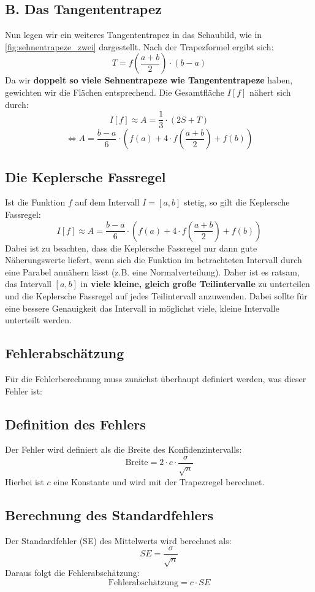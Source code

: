 \subsection*{B. Das Tangententrapez}

Nun legen wir ein weiteres Tangententrapez in das Schaubild, wie in \autoref{fig:sehnentrapeze_zwei} dargestellt. Nach der Trapezformel ergibt sich:
\[
T = f\left(\frac{a + b}{2}\right) \cdot (b - a)
\]
Da wir \textbf{doppelt so viele Sehnentrapeze wie Tangententrapeze} haben, gewichten wir die Flächen entsprechend. Die Gesamtfläche $I[f]$ nähert sich durch:
\[
I[f] \approx A = \frac{1}{3} \cdot (2S + T)
\]
\[
  \Leftrightarrow A = \frac{b - a}{6} \cdot \left(f(a) + 4 \cdot f\left(\frac{a + b}{2}\right) + f(b)\right)
\]

\subsection*{Die Keplersche Fassregel}

Ist die Funktion $f$ auf dem Intervall $I = [a, b]$ stetig, so gilt die Keplersche Fassregel:
\[
I[f] \approx A = \frac{b - a}{6} \cdot \left(f(a) + 4 \cdot f\left(\frac{a + b}{2}\right) + f(b)\right)
\]
Dabei ist zu beachten, dass die Keplersche Fassregel nur dann gute Näherungswerte liefert, wenn sich die Funktion im betrachteten Intervall durch eine Parabel annähern lässt (z.B. eine Normalverteilung). Daher ist es ratsam, das Intervall $[a, b]$ in \textbf{viele kleine, gleich große Teilintervalle} zu unterteilen und die Keplersche Fassregel auf jedes Teilintervall anzuwenden. Dabei sollte für eine bessere Genauigkeit das Intervall in möglichst viele, kleine Intervalle unterteilt werden. \cite{skript}

\subsection{Fehlerabschätzung}
\label{sec:fehlerabschätzung}

Für die Fehlerberechnung muss zunächst überhaupt definiert werden, was dieser Fehler ist:
\subsection*{Definition des Fehlers}
Der Fehler wird definiert als die Breite des Konfidenzintervalls:
\[
\text{Breite} = 2 \cdot c \cdot \frac{\sigma}{\sqrt{n}}
\]
Hierbei ist $c$ eine Konstante und wird mit der Trapezregel berechnet.

\subsection*{Berechnung des Standardfehlers}
Der Standardfehler (SE) des Mittelwerts wird berechnet als:
\[
SE = \frac{\sigma}{\sqrt{n}}
\]
Daraus folgt die Fehlerabschätzung:
\[
\text{Fehlerabschätzung} = c \cdot SE
\]
